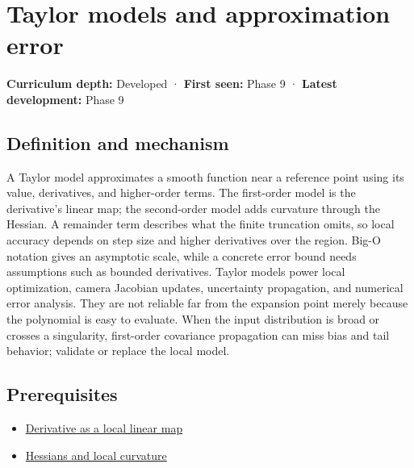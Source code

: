\hypertarget{appendix-32f39e9a3738}{}\label{referencestart:appendix-32f39e9a3738}
\section{Taylor models and approximation error}\label{appendix-32f39e9a3738-taylor-models-and-approximation-error}

\textbf{Curriculum depth:} Developed · \textbf{First seen:} Phase 9 · \textbf{Latest development:} Phase 9

\begin{allmightroledefinition}

\subsection{Definition and mechanism}\label{appendix-32f39e9a3738-definition-and-mechanism}

A Taylor model approximates a smooth function near a reference point using its value, derivatives, and higher-order terms. The first-order model is the derivative's linear map; the second-order model adds curvature through the Hessian. A remainder term describes what the finite truncation omits, so local accuracy depends on step size and higher derivatives over the region. Big-O notation gives an asymptotic scale, while a concrete error bound needs assumptions such as bounded derivatives. Taylor models power local optimization, camera Jacobian updates, uncertainty propagation, and numerical error analysis. They are not reliable far from the expansion point merely because the polynomial is easy to evaluate. When the input distribution is broad or crosses a singularity, first-order covariance propagation can miss bias and tail behavior; validate or replace the local model.

\end{allmightroledefinition}

\subsection{Prerequisites}\label{appendix-32f39e9a3738-prerequisites}

\begin{itemize}
\tightlist
\item
  \hyperref[appendix-7bc181935c42]{Derivative as a local linear map}
\item
  \hyperref[appendix-6ac071f8b50c]{Hessians and local curvature}
\end{itemize}

